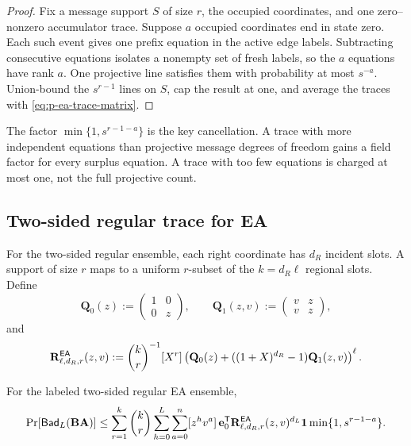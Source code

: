 \begin{proof}
Fix a message support $S$ of size $r$, the occupied coordinates, and one
zero--nonzero accumulator trace.  Suppose $a$ occupied coordinates end in
state zero.  Each such event gives one prefix equation in the active edge
labels.  Subtracting consecutive equations isolates a nonempty set of fresh
labels, so the $a$ equations have rank $a$.  One projective line satisfies
them with probability at most $s^{-a}$.  Union-bound the $s^{r-1}$ lines on
$S$, cap the result at one, and average the traces with
\eqref{eq:p-ea-trace-matrix}.
\end{proof}

The factor $\min\{1,s^{r-1-a}\}$ is the key cancellation.  A trace with more
independent equations than projective message degrees of freedom gains a
field factor for every surplus equation.  A trace with too few equations is
charged at most one, not the full projective count.

\subsection{Two-sided regular trace for EA}

For the two-sided regular ensemble, each right coordinate has $d_R$ incident
slots.  A support of size $r$ maps to a uniform $r$-subset of the
$k=d_R\ell$ regional slots.  Define
\begin{equation}
 \mathbf Q_0(z):=\begin{pmatrix}1&0\\0&z\end{pmatrix},
 \qquad
 \mathbf Q_1(z,v):=\begin{pmatrix}v&z\\v&z\end{pmatrix},
 \label{eq:p-ea-regular-trace-inputs}
\end{equation}
and
\begin{equation}
 \mathbf R^{\mathsf{EA}}_{\ell,d_R,r}(z,v):=
 \binom{k}{r}^{-1}[X^r]
 \left(\mathbf Q_0(z)+
 ((1+X)^{d_R}-1)\mathbf Q_1(z,v)\right)^\ell.
 \label{eq:p-ea-biregular-region}
\end{equation}

\begin{theorem}
\label{thm:p-ea-biregular-trace}
For the labeled two-sided regular EA ensemble,
\begin{equation}
 \Pr[\mathsf{Bad}_L(\mathbf B\mathbf A)]\leq
 \sum_{r=1}^{k}\binom{k}{r}
 \sum_{h=0}^{L}\sum_{a=0}^{n}[z^hv^a]\,
 \mathbf e_0^{\mathsf T}
 \mathbf R^{\mathsf{EA}}_{\ell,d_R,r}(z,v)^{d_L}\mathbf 1
 \min\{1,s^{r-1-a}\}.
 \label{eq:p-ea-biregular-trace}
\end{equation}
\end{theorem}

